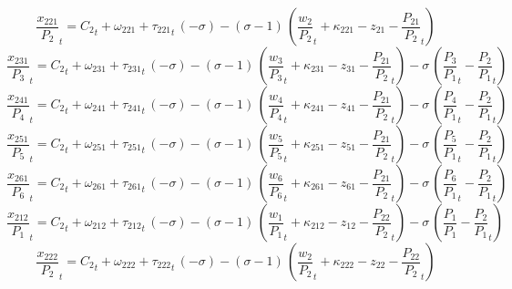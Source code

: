\begin{dmath}
{{\frac{x_{221}}{P_{2}}}}_{t}={{C_{2}}}_{t}+{{\omega_{221}}}+{{\tau_{221}}}_{t}\, \left(-{{\sigma}}\right)-\left({{\sigma}}-1\right)\, \left({{\frac{w_{2}}{P_{2}}}}_{t}+{{\kappa_{221}}}-{{z_{21}}}-{{\frac{P_{21}}{P_{2}}}}_{t}\right)
\end{dmath}
\begin{dmath}
{{\frac{x_{231}}{P_{3}}}}_{t}={{C_{2}}}_{t}+{{\omega_{231}}}+{{\tau_{231}}}_{t}\, \left(-{{\sigma}}\right)-\left({{\sigma}}-1\right)\, \left({{\frac{w_{3}}{P_{3}}}}_{t}+{{\kappa_{231}}}-{{z_{31}}}-{{\frac{P_{21}}{P_{2}}}}_{t}\right)-{{\sigma}}\, \left({{\frac{P_{3}}{P_{1}}}}_{t}-{{\frac{P_{2}}{P_{1}}}}_{t}\right)
\end{dmath}
\begin{dmath}
{{\frac{x_{241}}{P_{4}}}}_{t}={{C_{2}}}_{t}+{{\omega_{241}}}+{{\tau_{241}}}_{t}\, \left(-{{\sigma}}\right)-\left({{\sigma}}-1\right)\, \left({{\frac{w_{4}}{P_{4}}}}_{t}+{{\kappa_{241}}}-{{z_{41}}}-{{\frac{P_{21}}{P_{2}}}}_{t}\right)-{{\sigma}}\, \left({{\frac{P_{4}}{P_{1}}}}_{t}-{{\frac{P_{2}}{P_{1}}}}_{t}\right)
\end{dmath}
\begin{dmath}
{{\frac{x_{251}}{P_{5}}}}_{t}={{C_{2}}}_{t}+{{\omega_{251}}}+{{\tau_{251}}}_{t}\, \left(-{{\sigma}}\right)-\left({{\sigma}}-1\right)\, \left({{\frac{w_{5}}{P_{5}}}}_{t}+{{\kappa_{251}}}-{{z_{51}}}-{{\frac{P_{21}}{P_{2}}}}_{t}\right)-{{\sigma}}\, \left({{\frac{P_{5}}{P_{1}}}}_{t}-{{\frac{P_{2}}{P_{1}}}}_{t}\right)
\end{dmath}
\begin{dmath}
{{\frac{x_{261}}{P_{6}}}}_{t}={{C_{2}}}_{t}+{{\omega_{261}}}+{{\tau_{261}}}_{t}\, \left(-{{\sigma}}\right)-\left({{\sigma}}-1\right)\, \left({{\frac{w_{6}}{P_{6}}}}_{t}+{{\kappa_{261}}}-{{z_{61}}}-{{\frac{P_{21}}{P_{2}}}}_{t}\right)-{{\sigma}}\, \left({{\frac{P_{6}}{P_{1}}}}_{t}-{{\frac{P_{2}}{P_{1}}}}_{t}\right)
\end{dmath}
\begin{dmath}
{{\frac{x_{212}}{P_{1}}}}_{t}={{C_{2}}}_{t}+{{\omega_{212}}}+{{\tau_{212}}}_{t}\, \left(-{{\sigma}}\right)-\left({{\sigma}}-1\right)\, \left({{\frac{w_{1}}{P_{1}}}}_{t}+{{\kappa_{212}}}-{{z_{12}}}-{{\frac{P_{22}}{P_{2}}}}_{t}\right)-{{\sigma}}\, \left({{\frac{P_{1}}{P_{1}}}}-{{\frac{P_{2}}{P_{1}}}}_{t}\right)
\end{dmath}
\begin{dmath}
{{\frac{x_{222}}{P_{2}}}}_{t}={{C_{2}}}_{t}+{{\omega_{222}}}+{{\tau_{222}}}_{t}\, \left(-{{\sigma}}\right)-\left({{\sigma}}-1\right)\, \left({{\frac{w_{2}}{P_{2}}}}_{t}+{{\kappa_{222}}}-{{z_{22}}}-{{\frac{P_{22}}{P_{2}}}}_{t}\right)
\end{dmath}
